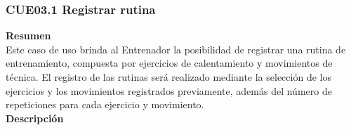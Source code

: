 \subsubsection{CUE03.1 Registrar rutina}
\label{cu:CUE03.1}

\textbf{\textcolor[rgb]{0, 0, 0.545098}{Resumen}} \\

Este caso de uso brinda al Entrenador la posibilidad de registrar una rutina de entrenamiento, compuesta por ejercicios de calentamiento y movimientos de técnica. El registro de las rutinas será realizado mediante la selección de los ejercicios y los movimientos registrados previamente, además del número de repeticiones para cada ejercicio y movimiento.\\

\textbf{\textcolor[rgb]{0, 0, 0.545098}{Descripción}} \\

